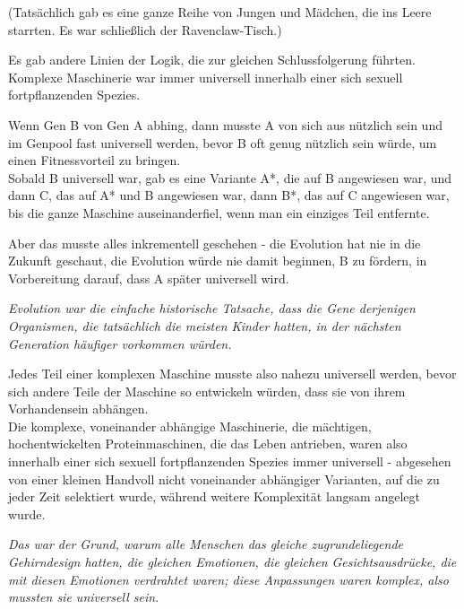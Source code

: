 {(Tatsächlich gab es eine ganze Reihe von Jungen und Mädchen, die ins Leere starrten. Es war schließlich der Ravenclaw-Tisch.)

Es gab andere Linien der Logik, die zur gleichen Schlussfolgerung führten. Komplexe Maschinerie war immer universell innerhalb einer sich sexuell fortpflanzenden Spezies.

Wenn Gen B von Gen A abhing, dann musste A von sich aus nützlich sein und im Genpool fast universell werden, bevor B oft genug nützlich sein würde, um einen Fitnessvorteil zu bringen.\\ Sobald B universell war, gab es eine Variante A*, die auf B angewiesen war, und dann C, das auf A* und B angewiesen war, dann B*, das auf C angewiesen war, bis die ganze Maschine auseinanderfiel, wenn man ein einziges Teil entfernte.

Aber das musste alles inkrementell geschehen - die Evolution hat nie in die Zukunft geschaut, die Evolution würde nie damit beginnen, B zu fördern, in Vorbereitung darauf, dass A später universell wird.

\emph{Evolution war die einfache historische Tatsache, dass die Gene derjenigen Organismen, die tatsächlich die meisten Kinder hatten, in der nächsten Generation häufiger vorkommen würden.}

Jedes Teil einer komplexen Maschine musste also nahezu universell werden, bevor sich andere Teile der Maschine so entwickeln würden, dass sie von ihrem Vorhandensein abhängen.\\ Die komplexe, voneinander abhängige Maschinerie, die mächtigen, hochentwickelten Proteinmaschinen, die das Leben antrieben, waren also innerhalb einer sich sexuell fortpflanzenden Spezies immer universell - abgesehen von einer kleinen Handvoll nicht voneinander abhängiger Varianten, auf die zu jeder Zeit selektiert wurde, während weitere Komplexität langsam angelegt wurde.

\emph{Das war der Grund, warum alle Menschen das gleiche zugrundeliegende Gehirndesign hatten, die gleichen Emotionen, die gleichen Gesichtsausdrücke, die mit diesen Emotionen verdrahtet waren; diese Anpassungen waren komplex, also mussten sie universell sein.}

}
